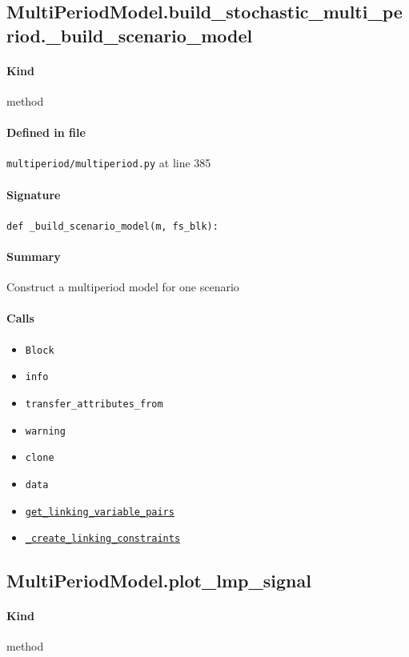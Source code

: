 \documentclass[11pt]{report}
\begin{document}
\subsection{MultiPeriodModel.build\_stochastic\_multi\_period.\_build\_scenario\_model}
\label{def:multiperiod-multiperiod.py:MultiPeriodModel.build_stochastic_multi_period._build_scenario_model:L385}
\paragraph{Kind} method
\paragraph{Defined in file} \texttt{multiperiod/multiperiod.py} at line 385
\paragraph{Signature} \texttt{def \_build\_scenario\_model(m, fs\_blk):}
\paragraph{Summary} Construct a multiperiod model for one scenario
\paragraph{Calls}
\begin{itemize}[leftmargin=*]
  \item \texttt{Block}
  \item \texttt{info}
  \item \texttt{transfer\_attributes\_from}
  \item \texttt{warning}
  \item \texttt{clone}
  \item \texttt{data}
  \item \hyperref[def:multiperiod-tests-test_multiperiod.py:get_linking_variable_pairs:L58]{\texttt{get\_linking\_variable\_pairs}}
  \item \hyperref[def:multiperiod-multiperiod.py:MultiPeriodModel._create_linking_constraints:L299]{\texttt{\_create\_linking\_constraints}}
\end{itemize}
\subsection{MultiPeriodModel.plot\_lmp\_signal}
\label{def:multiperiod-multiperiod.py:MultiPeriodModel.plot_lmp_signal:L493}
\paragraph{Kind} method
\end{document}
